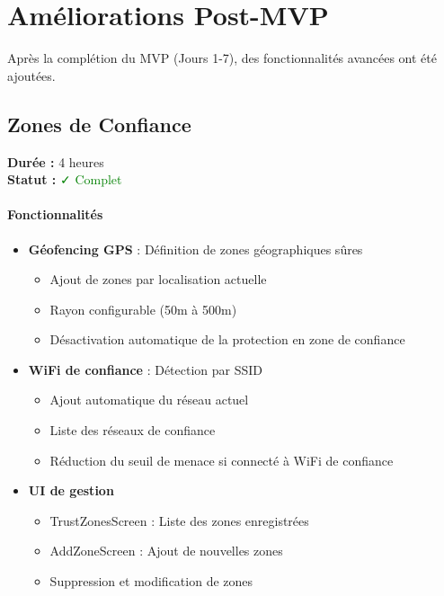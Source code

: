 \documentclass[11pt,a4paper]{article}
\begin{document}
\section{Améliorations Post-MVP}

Après la complétion du MVP (Jours 1-7), des fonctionnalités avancées ont été ajoutées.

\subsection{Zones de Confiance}

\textbf{Durée :} 4 heures \\
\textbf{Statut :} \textcolor{green}{✓ Complet}

\paragraph{Fonctionnalités}
\begin{itemize}
    \item \textbf{Géofencing GPS} : Définition de zones géographiques sûres
    \begin{itemize}
        \item Ajout de zones par localisation actuelle
        \item Rayon configurable (50m à 500m)
        \item Désactivation automatique de la protection en zone de confiance
    \end{itemize}
    \item \textbf{WiFi de confiance} : Détection par SSID
    \begin{itemize}
        \item Ajout automatique du réseau actuel
        \item Liste des réseaux de confiance
        \item Réduction du seuil de menace si connecté à WiFi de confiance
    \end{itemize}
    \item \textbf{UI de gestion}
    \begin{itemize}
        \item TrustZonesScreen : Liste des zones enregistrées
        \item AddZoneScreen : Ajout de nouvelles zones
        \item Suppression et modification de zones
    \end{itemize}
\end{itemize}
\end{document}
